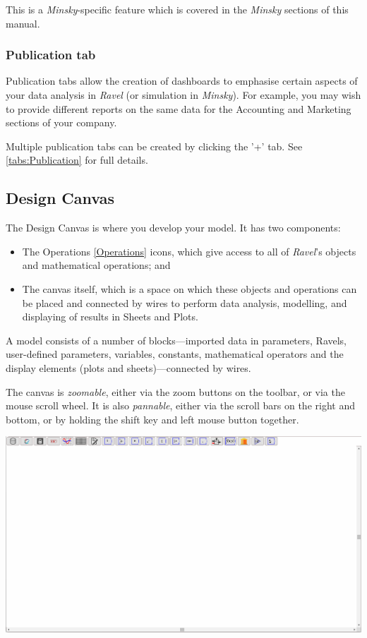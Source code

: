 \label{tabs:Phillips}

This is a \emph{Minsky}-specific feature which is covered in the \emph{Minsky
}sections of this manual.

\subsubsection{Publication tab}

Publication tabs allow the creation of dashboards to emphasise certain
aspects of your data analysis in \emph{Ravel }(or simulation in \emph{Minsky}).
For example, you may wish to provide different reports on the same
data for the Accounting and Marketing sections of your company.

Multiple publication tabs can be created by clicking the '+' tab.
See \ref{tabs:Publication} for full details.

\subsection{Design Canvas}

\label{DesignCanvas}

The Design Canvas is where you develop your model. It has two components:
\begin{itemize}
\item The Operations \ref{Operations} icons, which give access to all of
\emph{Ravel}'s objects and mathematical operations; and
\item The canvas itself, which is a space on which these objects and operations
can be placed and connected by wires to perform data analysis, modelling,
and displaying of results in Sheets and Plots.
\end{itemize}
A model consists of a number of blocks---imported data in parameters,
Ravels, user-defined parameters, variables, constants, mathematical
operators and the display elements (plots and sheets)---connected
by wires.

The canvas is \emph{zoomable}, either via the zoom buttons on the
toolbar, or via the mouse scroll wheel. It is also \emph{pannable},
either via the scroll bars on the right and bottom, or by holding
the shift key and left mouse button together. 

\includegraphics[width=15cm]{images/DesignCanvas}

